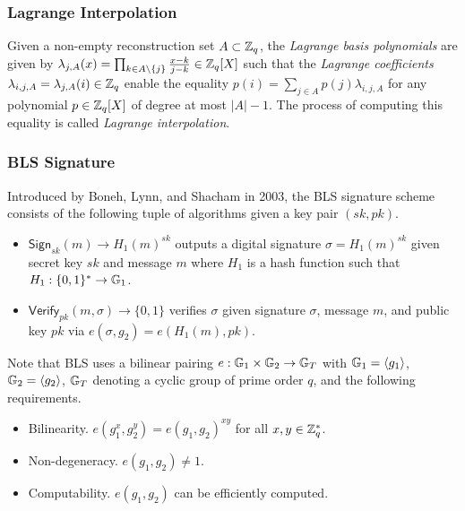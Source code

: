 
\subsubsection{Lagrange Interpolation}
\label{appendix:lagrange}
Given a non-empty reconstruction set $A \subset \mathbb{Z}_q$, the \textit{Lagrange basis polynomials} are given by $\lambda_{j, A}(x) = \prod_{k \in A \setminus \{j\}} \frac{x - k}{j - k} \in \mathbb{Z}_q[X]$ such that the \textit{Lagrange coefficients} $\lambda_{i, j, A} = \lambda_{j, A}(i) \in \mathbb{Z}_q$ enable the equality $p(i) = \sum_{j \in A} p(j) \lambda_{i, j, A}$ for any polynomial $p \in \mathbb{Z}_q[X]$ of degree at most $|A| - 1$. The process of computing this equality is called \textit{Lagrange interpolation}.

\subsubsection{BLS Signature}
\label{appendix:bls}
Introduced by Boneh, Lynn, and Shacham in 2003, the BLS signature scheme~\cite{boneh2001short} consists of the following tuple of algorithms given a key pair $(sk, pk)$.
\begin{itemize}
\item $\mathsf{Sign}_{sk}(m) \rightarrow H_1(m)^{sk}$ outputs a digital signature $\sigma = H_1(m)^{sk}$ given secret key $sk$ and message $m$ where $H_1$ is a hash function such that $H_1: \{0, 1\}^* \rightarrow \mathbb{G}_1$.
\item $\mathsf{Verify}_{pk}(m, \sigma) \rightarrow \{0, 1\}$ verifies $\sigma$ given signature $\sigma$, message $m$, and public key $pk$ via $e(\sigma, g_2) = e(H_1(m), pk)$.
\end{itemize}
Note that BLS uses a bilinear pairing $e: \mathbb{G}_1 \times \mathbb{G}_2 \rightarrow \mathbb{G}_T$ with $\mathbb{G}_1 = \langle g_1 \rangle$, $\mathbb{G}_2 = \langle g_2 \rangle$, $\mathbb{G}_T$ denoting a cyclic group of prime order $q$, and the following requirements.
\begin{itemize}
\item Bilinearity. $e(g_1^x, g_2^y) = e(g_1, g_2)^{x y}$ for all $x, y \in \mathbb{Z}^*_q$.
\item Non-degeneracy. $e(g_1, g_2) \neq 1$.
\item Computability. $e(g_1, g_2)$ can be efficiently computed.
\end{itemize}

